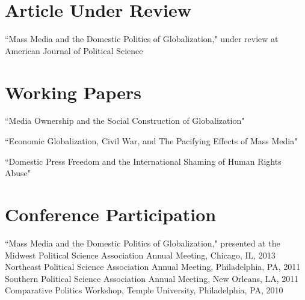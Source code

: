 \documentclass[margin, 12pt]{res} %
\begin{document}
\begin{resume}
\section{Article Under Review} 

``Mass Media and the Domestic Politics of Globalization," under review at American Journal of Political Science


\section{Working Papers} 

``Media Ownership and the Social Construction of Globalization"

``Economic Globalization, Civil War, and The Pacifying Effects of Mass Media" 

``Domestic Press Freedom and the International Shaming of Human Rights Abuse"


\section{Conference Participation} 

``Mass Media and the Domestic Politics of Globalization," presented at the Midwest Political Science Association Annual Meeting, Chicago, IL, 2013 \vspace{3 mm} \\
Northeast Political Science Association Annual Meeting, Philadelphia, PA,  2011  \vspace{3 mm} \\ 
Southern Political Science Association Annual Meeting, New Orleans, LA, 2011 \vspace{3 mm} \\
Comparative Politics Workshop, Temple University, Philadelphia, PA, 2010 \\



\end{resume}
\end{document}

